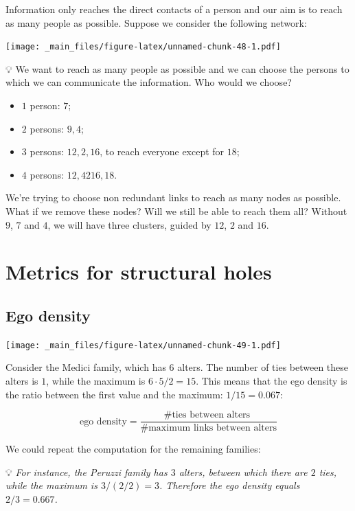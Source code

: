 \documentclass[
  notitlepage,
  onecolumn,
  openany]{book}
\providecommand{\tightlist}{%
  \setlength{\itemsep}{0pt}\setlength{\parskip}{0pt}}
\begin{document}
Information only reaches the direct contacts of a person and our aim is to reach as many people as possible. Suppose we consider the following network:

\texttt{[image: \_main\_files/figure-latex/unnamed-chunk-48-1.pdf]}

💡 We want to reach as many people as possible and we can choose the
persons to which we can communicate the information. Who would we
choose?

\begin{itemize}
\tightlist
\item
  \(1\) person: \(7\);
\item
  \(2\) persons: \(9, 4\);
\item
  \(3\) persons: \(12, 2, 16\), to reach everyone except for \(18\);
\item
  \(4\) persons: \(12, 42 16, 18\).
\end{itemize}

We're trying to choose non redundant links to reach as many nodes as
possible. What if we remove these nodes? Will we still be able to reach
them all? Without \(9\), \(7\) and \(4\), we will have three clusters, guided
by \(12\), \(2\) and \(16\).

\hypertarget{metrics-for-structural-holes}{%
\chapter{Metrics for structural holes}\label{metrics-for-structural-holes}}

\hypertarget{ego-density}{%
\section{Ego density}\label{ego-density}}

\texttt{[image: \_main\_files/figure-latex/unnamed-chunk-49-1.pdf]}

Consider the Medici family, which has \(6\) alters. The number of ties between these alters is \(1\), while the maximum is \(6\cdot 5/2 = 15\). This means that the ego density is the ratio between the first value and the maximum: \(1/15 = 0.067\):

\[
\text{ego density} = \frac{ \text{\# ties between alters }}{\text{\# maximum links between alters}}
\]

We could repeat the computation for the remaining families:

💡 \emph{For instance, the Peruzzi family has \(3\) alters, between which there are \(2\) ties, while the maximum is \(3/(2/2) = 3\). Therefore the ego density equals \(2/3 = 0.667\).}
\end{document}
